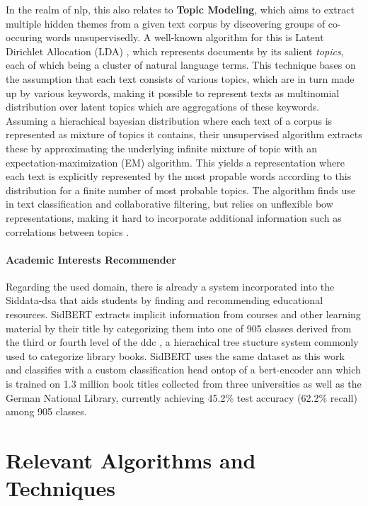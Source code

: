 In the realm of \gls{nlp}, this also relates to \textbf{Topic Modeling}, which aims to extract multiple hidden themes from a given text corpus by discovering groups of co-occuring words unsupervisedly. A well-known algorithm for this is Latent Dirichlet Allocation (LDA) \cite{Blei2003}, which represents documents by its salient \textit{topics}, each of which being a cluster of natural language terms. This technique bases on the assumption that each text consists of various topics, which are in turn made up by various keywords, making it possible to represent texts as multinomial distribution over latent topics which are aggregations of these keywords. Assuming a hierachical bayesian distribution where each text of a corpus is represented as mixture of topics it contains, their unsupervised algorithm extracts these by approximating the underlying infinite mixture of topic with an expectation-maximization (EM) algorithm. This yields a representation where each text is explicitly represented by the most propable words according to this distribution for a finite number of most probable topics. The algorithm finds use in text classification and collaborative filtering, but relies on unflexible \gls{bow} representations, making it hard to incorporate additional information such as correlations between topics \cite{Ager2018}.


\paragraph{Academic Interests Recommender}

Regarding the used domain, there is already a system incorporated into the Siddata-\gls{dsa} that aids students by finding and recommending educational resources. SidBERT \cite{Schrumpf2021DELPHI} extracts implicit information from courses and other learning material by their title by categorizing them into one of 905 classes derived from the third or fourth level of the \gls{ddc} \cite{Dewey1876}, a hierachical tree stucture system commonly used to categorize library books. SidBERT uses the same dataset as this work and classifies with a custom classification head ontop of a \gls{bert}-encoder \gls{ann} which is trained on 1.3 million book titles collected from three universities as well as the German National Library, currently achieving 45.2\% test accuracy (62.2\% recall) among 905 classes.



\section{Relevant Algorithms and Techniques}
\label{sec:required_algos}

